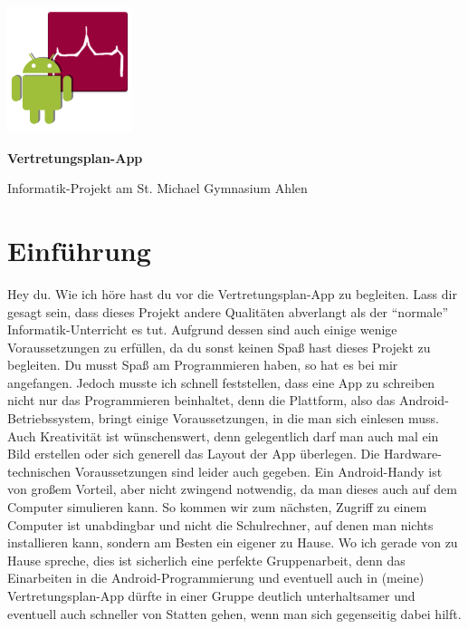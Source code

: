 \documentclass[12pt,headsepline]{scrartcl}
\begin{document}
\begin{center}
\includegraphics[scale=0.75]{icon_android.png}

\textbf{\Huge{Vertretungsplan-App}}

Informatik-Projekt am St. Michael Gymnasium Ahlen
\end{center}
\vspace{7cm}
\tableofcontents

\newpage
\setcounter{page}{1}
\pagestyle{headings}
\cfoot{} \ifoot{} \ofoot{}\chead{}
\ohead{\pagemark}
\ihead{\rightmark}
\pagestyle{scrheadings}

\section{Einführung}
Hey du.
Wie ich höre hast du vor die Vertretungsplan-App zu begleiten. Lass dir gesagt sein, dass dieses Projekt andere Qualitäten abverlangt als der ``normale'' Informatik-Unterricht es tut. Aufgrund dessen sind auch einige wenige Voraussetzungen zu erfüllen, da du sonst keinen Spaß hast dieses Projekt zu begleiten. Du musst Spaß am Programmieren haben, so hat es bei mir angefangen. Jedoch musste ich schnell feststellen, dass eine App zu schreiben nicht nur das Programmieren beinhaltet, denn die Plattform, also das Android-Betriebssystem, bringt einige Voraussetzungen, in die man sich einlesen muss. Auch Kreativität ist wünschenswert, denn gelegentlich darf man auch mal ein Bild erstellen oder sich generell das Layout der App überlegen. Die Hardware-technischen Voraussetzungen sind leider auch gegeben. Ein Android-Handy ist von großem Vorteil, aber nicht zwingend notwendig, da man dieses auch auf dem Computer simulieren kann. 
So kommen wir zum nächsten, Zugriff zu einem Computer ist unabdingbar und nicht die 
Schulrechner, auf denen man nichts installieren kann, sondern am Besten ein eigener zu Hause. Wo ich gerade von zu Hause spreche, dies ist sicherlich eine perfekte Gruppenarbeit, denn das Einarbeiten in die Android-Programmierung und eventuell auch in (meine) Vertretungsplan-App dürfte in einer Gruppe deutlich unterhaltsamer und eventuell auch schneller von Statten gehen, wenn man sich gegenseitig dabei hilft.
\end{document}

